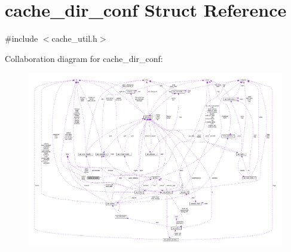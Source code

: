 \hypertarget{structcache__dir__conf}{}\section{cache\+\_\+dir\+\_\+conf Struct Reference}
\label{structcache__dir__conf}


{\ttfamily \#include $<$cache\+\_\+util.\+h$>$}



Collaboration diagram for cache\+\_\+dir\+\_\+conf\+:
\nopagebreak
\begin{figure}[H]
\begin{center}
\leavevmode
\includegraphics[width=350pt]{structcache__dir__conf__coll__graph}
\end{center}
\end{figure}
